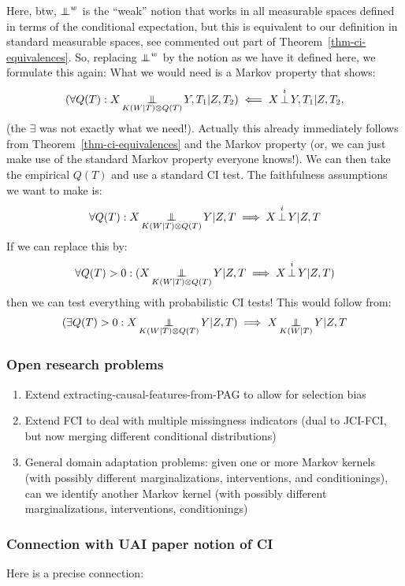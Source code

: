 Here, btw, $\operatorname*{\perp\mkern-11mu\perp}^w$ is the ``weak'' notion that works in all measurable spaces defined in terms of the conditional expectation,
but this is equivalent to our definition in standard measurable spaces, see commented out part of Theorem~\ref{thm-ci-equivalences}.
So, replacing $\operatorname*{\perp\mkern-11mu\perp}^w$ by the notion as we have it defined here, we formulate this again:
What we would need is a Markov property that shows:
$$(\forall Q(T) : X \operatorname*{\perp\mkern-11mu\perp}_{K(W|T)\otimes Q(T)} Y,T_1 | Z,T_2) \impliedby X \operatorname*{\perp}^i Y,T_1 | Z,T_2,$$
(the $\exists$ was not exactly what we need!). 
Actually this already immediately follows from Theorem~\ref{thm-ci-equivalences} and the Markov property
(or, we can just make use of the standard Markov property everyone knows!).
We can then take the empirical $Q(T)$ and use a standard CI test.
The faithfulness assumptions we want to make is:
$$\forall Q(T) : X \operatorname*{\perp\mkern-11mu\perp}_{K(W|T)\otimes Q(T)} Y | Z,T \implies X \operatorname*{\perp}^i Y | Z,T$$
If we can replace this by:
$$\forall Q(T) > 0 : (X \operatorname*{\perp\mkern-11mu\perp}_{K(W|T)\otimes Q(T)} Y | Z,T \implies X \operatorname*{\perp}^i Y | Z,T)$$
then we can test everything with probabilistic CI tests!
This would follow from:
$$(\exists Q(T) > 0 : X \operatorname*{\perp\mkern-11mu\perp}_{K(W|T)\otimes Q(T)} Y | Z,T) \implies X \operatorname*{\perp\mkern-11mu\perp}_{K(W|T)} Y | Z,T$$

\subsubsection{Open research problems}

\begin{enumerate}
  \item Extend extracting-causal-features-from-PAG to allow for selection bias
  \item Extend FCI to deal with multiple missingness indicators (dual to JCI-FCI, but now merging different conditional distributions)
  \item General domain adaptation problems: given one or more Markov kernels (with possibly different marginalizations, interventions, and conditionings), can we identify another Markov kernel (with possibly different marginalizations, interventions, conditionings)
\end{enumerate}


\subsubsection{Connection with UAI paper notion of CI}

Here is a precise connection:

